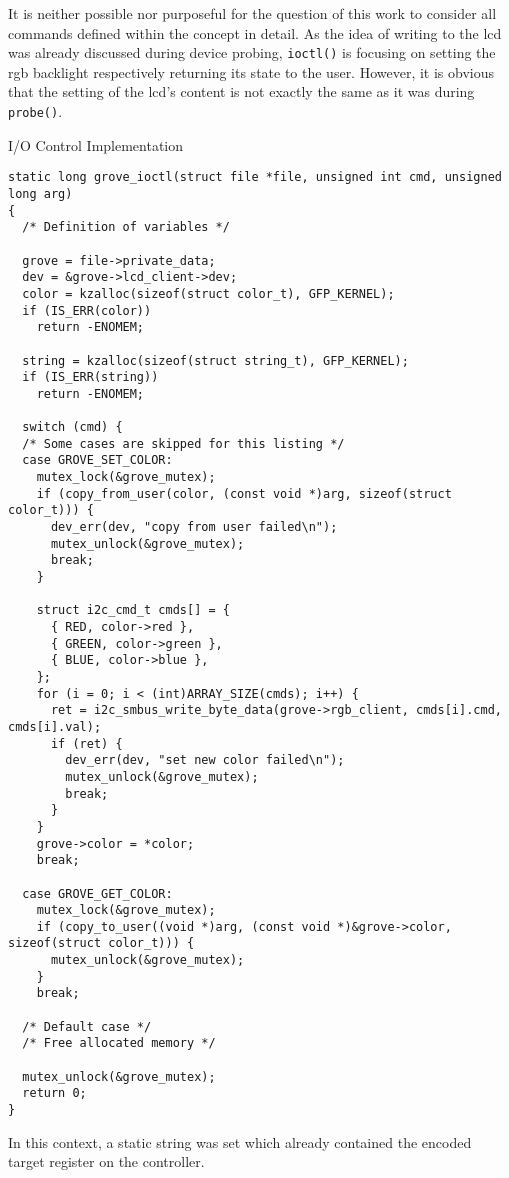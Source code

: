 It is neither possible nor purposeful for the question of this work to consider all commands defined within the concept in detail.
As the idea of writing to the \ac{lcd} was already discussed during device probing, \texttt{ioctl()} is focusing on setting the \ac{rgb} backlight respectively returning its state to the user.
However, it is obvious that the setting of the \ac{lcd}'s content is not exactly the same as it was during \texttt{probe()}.
%
\begin{listing} [H]
    \caption{I/O Control Implementation}
    \label{lst:ioctl}
    \begin{verbatim}
static long grove_ioctl(struct file *file, unsigned int cmd, unsigned long arg)
{
  /* Definition of variables */

  grove = file->private_data;
  dev = &grove->lcd_client->dev;
  color = kzalloc(sizeof(struct color_t), GFP_KERNEL);
  if (IS_ERR(color))
    return -ENOMEM;

  string = kzalloc(sizeof(struct string_t), GFP_KERNEL);
  if (IS_ERR(string))
    return -ENOMEM;

  switch (cmd) {
  /* Some cases are skipped for this listing */
  case GROVE_SET_COLOR:
    mutex_lock(&grove_mutex);
    if (copy_from_user(color, (const void *)arg, sizeof(struct color_t))) {
      dev_err(dev, "copy from user failed\n");
      mutex_unlock(&grove_mutex);
      break;
    }

    struct i2c_cmd_t cmds[] = {
      { RED, color->red },
      { GREEN, color->green },
      { BLUE, color->blue },
    };
    for (i = 0; i < (int)ARRAY_SIZE(cmds); i++) {
      ret = i2c_smbus_write_byte_data(grove->rgb_client, cmds[i].cmd, cmds[i].val);
      if (ret) {
        dev_err(dev, "set new color failed\n");
        mutex_unlock(&grove_mutex);
        break;
      }
    }   
    grove->color = *color;
    break;

  case GROVE_GET_COLOR:
    mutex_lock(&grove_mutex);
    if (copy_to_user((void *)arg, (const void *)&grove->color, sizeof(struct color_t))) {
      mutex_unlock(&grove_mutex);
    }
    break;

  /* Default case */ 
  /* Free allocated memory */

  mutex_unlock(&grove_mutex);
  return 0;
}
    \end{verbatim}
\end{listing}
%
In this context, a static string was set which already contained the encoded target register on the controller.
